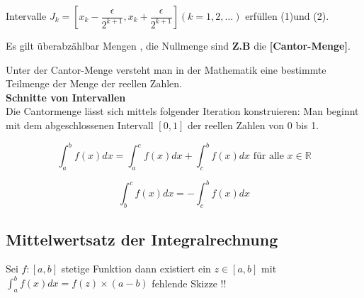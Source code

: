 Intervalle $J_k = [x_k - \dfrac{\epsilon}{2^{k+1}}, x_k + \dfrac{\epsilon}{2^{k+1}}](k=1,2,\dots)$ erfüllen (1)und (2).
\begin{remark}
Es gilt überabzählbar Mengen , die Nullmenge sind \textbf{Z.B} die \textbf{[Cantor-Menge]}.
\end{remark}
\begin{definition}
Unter der Cantor-Menge versteht man in der Mathematik eine bestimmte Teilmenge der Menge der reellen Zahlen.\\
\textbf{Schnitte von Intervallen}\\
Die Cantormenge lässt sich mittels folgender Iteration konstruieren:
Man beginnt mit dem abgeschlossenen Intervall $[0,1]$ der reellen Zahlen von 0 bis 1. 
\end{definition}
\[ \int_{a}^{b} f(x) dx = \int_{a}^{c} f(x) dx + \int_{c}^{b} f(x) dx \text{ für alle } x \in \mathbb{R} \]
\begin{definition}
$$ \int_{b}^{c} f(x) dx = - \int_{c}^{b} f(x) dx $$ 
\end{definition}
\subsection{Mittelwertsatz der Integralrechnung}
Sei $f : [a,b]$ stetige Funktion  dann existiert ein $ z \in [a,b]$ mit $\int_{a}^{b} f(x) dx = f(z) \times (a-b)$
fehlende Skizze !!
